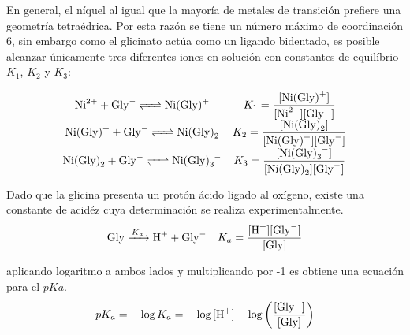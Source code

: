 \documentclass[fleqn,10pt]{SelfArx} %
\begin{document}
    En general, el n\'iquel al igual que la mayor\'ia de metales de transici\'on prefiere una geometr\'ia tetra\'edrica. Por esta raz\'on se tiene un n\'umero m\'aximo de coordinaci\'on 6, sin embargo como el glicinato act\'ua como un ligando bidentado, es posible alcanzar \'unicamente tres diferentes iones en soluci\'on con constantes de equil\'ibrio $K_1$, $K_2$ y $K_3$:
    
    \footnotesize
    \begin{equation*}
        \begin{array}{cc}
        \ce{Ni^{2+} + Gly- <=> Ni(Gly)+} & K_1 = \dfrac{\ce{[Ni(Gly)+]}}{\ce{[Ni^{2+}][Gly^-]}}\\
        \ce{Ni(Gly)+ + Gly- <=> Ni(Gly)_2} & K_2 = \dfrac{\ce{[Ni(Gly)_2]}}{\ce{[Ni(Gly)+][Gly^-]}}\\
        \ce{Ni(Gly)_2 + Gly- <=> Ni(Gly)_3-} & K_3 = \dfrac{\ce{[Ni(Gly)_3^-]}}{\ce{[Ni(Gly)_2][Gly^-]}}
        \end{array}
    \end{equation*}
    \normalsize
    
    Dado que la glicina presenta un prot\'on \'acido ligado al ox\'igeno, existe una constante de acid\'ez cuya determinaci\'on se realiza experimentalmente.
    \begin{equation}\label{Ka}
	    \begin{array}{lr}
	    \ce{Gly ->[K_a] H+ + Gly^-} & K_a = \dfrac{\ce{[H+][Gly^-]}}{\ce{[Gly]}}
	    \end{array}
    \end{equation}
    
	aplicando logaritmo a ambos lados y multiplicando por -1 es obtiene una ecuaci\'on para el $pKa$.
	\begin{equation}
		pK_a = -\log K_a = -\log\ce{[H+]} - \log\left(\dfrac{\ce{[Gly^-]}}{\ce{[Gly]}}\right)
	\end{equation}   
\end{document}
